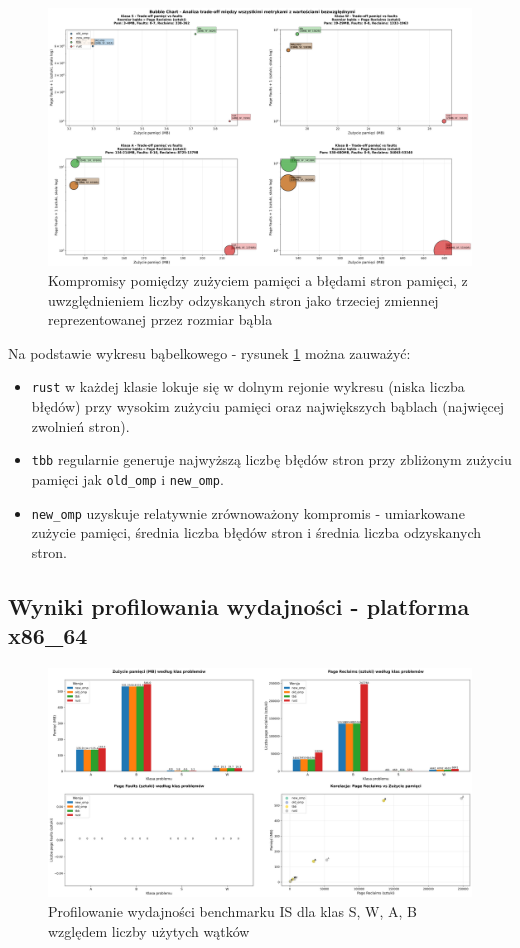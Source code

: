 \begin{figure}[H]
    \centering
    \includegraphics[width=\textwidth]{analiza/images/parallel/is/arm/chart_06_bubble_chart.png}
    \caption{Kompromisy  pomiędzy zużyciem pamięci a błędami stron pamięci, z uwzględnieniem liczby odzyskanych stron jako trzeciej zmiennej reprezentowanej przez rozmiar bąbla}
    \label{is_kompromisy_pamiec_bledy}
\end{figure}
Na podstawie wykresu bąbelkowego - rysunek \ref{is_kompromisy_pamiec_bledy} można zauważyć:
\begin{itemize}
    \item \texttt{rust} w każdej klasie lokuje się w dolnym rejonie wykresu (niska liczba błędów) przy wysokim zużyciu pamięci oraz największych bąblach (najwięcej zwolnień stron).
    \item \texttt{tbb} regularnie generuje najwyższą liczbę błędów stron przy zbliżonym zużyciu pamięci jak \texttt{old\_omp} i \texttt{new\_omp}.
    \item \texttt{new\_omp} uzyskuje relatywnie zrównoważony kompromis - umiarkowane zużycie pamięci, średnia liczba błędów stron i średnia liczba odzyskanych stron.
\end{itemize}
\subsection{Wyniki profilowania wydajności - platforma x86\_64}
\begin{figure}[H]
    \centering
    \includegraphics[width=\textwidth]{analiza/images/parallel/is/x86/chart_01_memory_comparison.png}
    \caption{Profilowanie wydajności benchmarku IS dla klas S, W, A, B względem liczby użytych wątków}
    \label{is_porownanie_zuzycia_pamieci_x86}
\end{figure}

